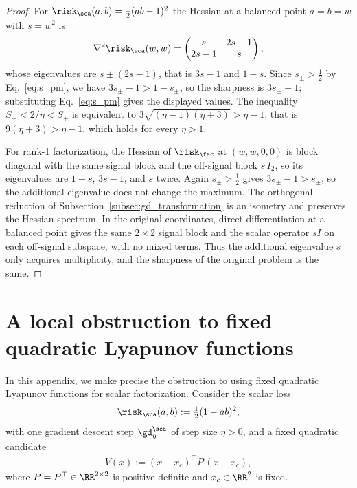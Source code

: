 \documentclass{article}
\begin{document}
\begin{proof}
For $\risk_\sca(a,b)=\tfrac12(ab-1)^2$ the Hessian at a balanced point $a=b=w$
with $s=w^2$ is
\begin{align}
    \nabla^2\risk_\sca(w,w)
    =
    \begin{pmatrix}
        s & 2s-1\\
        2s-1 & s
    \end{pmatrix},
\end{align}
whose eigenvalues are $s\pm(2s-1)$, that is $3s-1$ and $1-s$. Since
$s_\pm>\tfrac12$ by Eq.~\eqref{eq:s_pm}, we have $3s_\pm-1>1-s_\pm$, so the
sharpness is $3s_\pm-1$; substituting Eq.~\eqref{eq:s_pm} gives the displayed
values. The inequality $S_-<2/\eta<S_+$ is equivalent to
$3\sqrt{(\eta-1)(\eta+3)}>\eta-1$, that is $9(\eta+3)>\eta-1$, which holds for
every $\eta>1$.

For rank-1 factorization, the Hessian of $\risk_\fac$ at $(w,w,0,0)$ is block
diagonal with the same signal block and the off-signal block $s\,I_2$, so its
eigenvalues are $1-s$, $3s-1$, and $s$ twice. Again $s_\pm>\tfrac12$ gives
$3s_\pm-1>s_\pm$, so the additional eigenvalue does not change the maximum. The
orthogonal reduction of Subsection~\ref{subsec:gd_transformation} is an isometry
and preserves the Hessian spectrum. In the original coordinates, direct
differentiation at a balanced point gives the same $2\times2$ signal block and
the scalar operator $sI$ on each off-signal subspace, with no mixed terms.
Thus the additional eigenvalue $s$ only acquires multiplicity, and the sharpness
of the original problem is the same.
\end{proof}

\section{A local obstruction to fixed quadratic Lyapunov functions}
\label{appendix:state-dependent-lyapunov}

In this appendix, we make precise the obstruction to using fixed quadratic Lyapunov
functions for scalar factorization. Consider the scalar loss
\begin{align}
    \risk_\sca(a,b) := \tfrac{1}{2}(1-ab)^2,
\end{align}
with one gradient descent step $\gd_\eta^\sca$ of step size $\eta > 0$, and a fixed
quadratic candidate
\begin{align}
    V(x) := (x-x_c)^\top P\,(x-x_c),
\end{align}
where $P=P^\top\in \RR^{2\times 2}$ is positive definite and
$x_c \in \RR^2$ is fixed.
\end{document}
